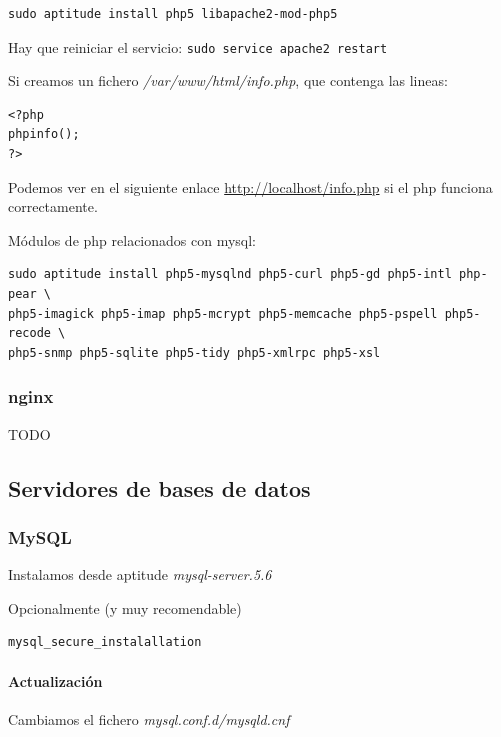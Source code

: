 \documentclass[12pt,spanish,]{article}
\let\oldparagraph\paragraph
\renewcommand{\paragraph}[1]{\oldparagraph{#1}\mbox{}}
\begin{document}
\begin{verbatim}
sudo aptitude install php5 libapache2-mod-php5
\end{verbatim}

Hay que reiniciar el servicio: \texttt{sudo\ service\ apache2\ restart}

Si creamos un fichero \emph{/var/www/html/info.php}, que contenga las
lineas:

\begin{verbatim}
<?php
phpinfo();
?>
\end{verbatim}

Podemos ver en el siguiente enlace \url{http://localhost/info.php} si el
php funciona correctamente.

Módulos de php relacionados con mysql:

\begin{verbatim}
sudo aptitude install php5-mysqlnd php5-curl php5-gd php5-intl php-pear \
php5-imagick php5-imap php5-mcrypt php5-memcache php5-pspell php5-recode \
php5-snmp php5-sqlite php5-tidy php5-xmlrpc php5-xsl
\end{verbatim}

\subsubsection{nginx}\label{nginx}

TODO

\subsection{Servidores de bases de
datos}\label{servidores-de-bases-de-datos}

\subsubsection{MySQL}\label{mysql}

Instalamos desde aptitude \emph{mysql-server.5.6}

Opcionalmente (y muy recomendable)

\begin{verbatim}
mysql_secure_instalallation
\end{verbatim}

\paragraph{Actualización}\label{actualizaciuxf3n}

Cambiamos el fichero \emph{mysql.conf.d/mysqld.cnf}
\end{document}
